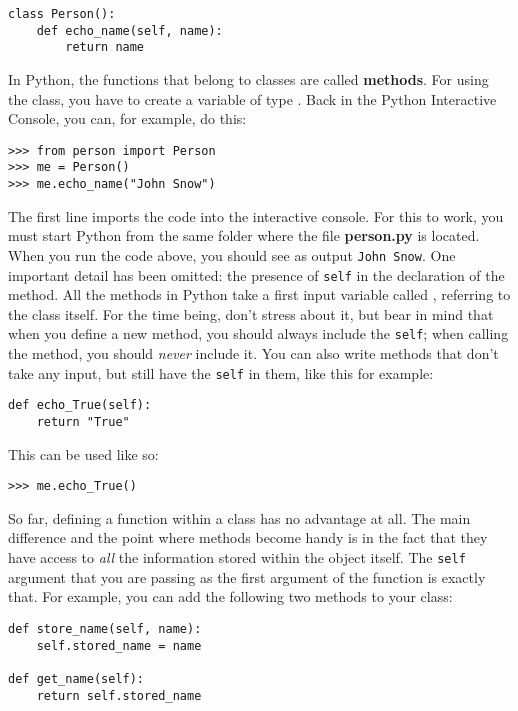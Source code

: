 \begin{verbatim}
class Person():
    def echo_name(self, name):
        return name
\end{verbatim}

In Python, the functions that belong to classes are called \textbf{methods}. For using the class, you have to create a variable of type . Back in the Python Interactive Console, you can, for example, do this:

\begin{verbatim}
>>> from person import Person
>>> me = Person()
>>> me.echo_name("John Snow")
\end{verbatim}

The first line imports the code into the interactive console. For this to work, you must start Python from the same folder where the file \textbf{person.py} is located. When you run the code above, you should see as output \texttt{John Snow}. One important detail has been omitted: the presence of \texttt{self} in the declaration of the method. All the methods in Python take a first input variable called , referring to the class itself. For the time being, don't stress about it, but bear in mind that when you define a new method, you should always include the \texttt{self}; when calling the method, you should \emph{never} include it. You can also write methods that don't take any input, but still have the \texttt{self} in them, like this for example:

\begin{verbatim}
def echo_True(self):
    return "True"
\end{verbatim}

This can be used like so:

\begin{verbatim}
>>> me.echo_True()
\end{verbatim}

So far, defining a function within a class has no advantage at all. The main difference and the point where methods become handy is in the fact that they have access to \emph{all} the information stored within the object itself. The \texttt{self} argument that you are passing as the first argument of the function is exactly that. For example, you can add the following two methods to your  class:

\begin{verbatim}
def store_name(self, name):
    self.stored_name = name

def get_name(self):
    return self.stored_name
\end{verbatim}

